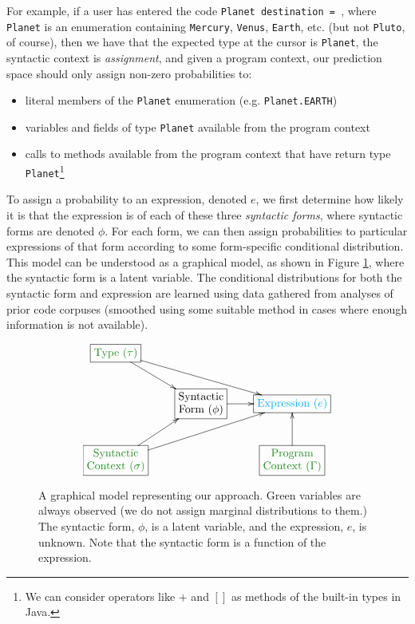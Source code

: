 \documentclass{article} %
\begin{document}
For example, if a user has entered the code \texttt{Planet destination = }, where \verb|Planet| is an enumeration containing \verb|Mercury|, \verb|Venus|, \verb|Earth|, etc. (but not \verb|Pluto|, of course), then we have that the expected type at the cursor is \verb|Planet|, the syntactic context is \emph{assignment}, and given a program context, our prediction space should only assign non-zero probabilities to:
\begin{itemize}
\item literal members of the \verb|Planet| enumeration (e.g. \verb|Planet.EARTH|)
\item variables and fields of type \verb|Planet| available from the program context
\item calls to methods available from the program context that have return type \texttt{Planet}\footnote{We can consider  operators like $+$ and $[]$ as methods of the built-in types in Java.}
\end{itemize}
To assign a probability to an expression, denoted $e$, we first determine how likely it is that the expression is of each of these three \emph{syntactic forms}, where syntactic forms are denoted $\phi$. For each form, we can then assign probabilities to particular expressions of that form according to some form-specific conditional distribution. This model can be understood as a graphical model, as shown in Figure \ref{graphicalmodel}, where the syntactic form is a latent variable. The conditional distributions for both the syntactic form and expression are learned using data gathered from analyses of prior code corpuses (smoothed using some suitable method in cases where enough information is not available).

\begin{figure}
    \begin{displaymath}
    \xymatrix{
      *+[F]{\color{ForestGreen}\txt{Type ($\tau$)}} \ar[dr] \ar[drr] & & \\
      & *+[F]{\color{black} \txt{Syntactic\\Form ($\phi$)}} \ar[r] & *+[F]{\color{cyan}\txt{Expression ($e$)}}  \\
      *+[F]{\color{ForestGreen}\txt{Syntactic\\Context ($\sigma$)}} \ar[ur] \ar[urr] & & *+[F]{\color{ForestGreen}\txt{Program\\Context ($\Gamma$)}} \ar[u]  
    }
    \end{displaymath}
\caption{A graphical model representing our approach. Green variables are always observed (we do not assign marginal distributions to them.) The syntactic form, $\phi$, is a latent variable, and the expression, $e$, is unknown. Note that the syntactic form is a function of the expression. \label{graphicalmodel}}
\end{figure}
\end{document}
